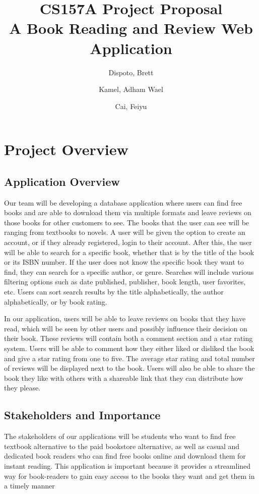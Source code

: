 \documentclass[letter, 12pt, titlepage]{article}
\author{ Dispoto, Brett\\
	\and
	Kamel, Adham Wael\\
	\and
	Cai, Feiyu\\
}
\title{CS157A Project Proposal \\
	\large A Book Reading and Review Web Application}
\begin{document}
	\maketitle
	\section{Project Overview}
	\subsection{Application Overview}
	Our team will be developing a database application where users can find free books and are able to download them via multiple formats and leave reviews on those books for other customers to see. The books that the user can see will be ranging from textbooks to novels. A user will be given the option to create an account, or if they already registered, login to their account. After this, the user will be able to search for a specific book, whether that is by the title of the book or its ISBN number. If the user does not know the specific book they want to find, they can search for a specific author, or genre. Searches will include various filtering options such as date published, publisher, book length, user favorites, etc. Users can sort search results by the title alphabetically, the author alphabetically, or by book rating.

\medskip
	In our application, users will be able to leave reviews on books that they have read, which will be seen by other users and possibly influence their decision on their book. These reviews will contain both a comment section and a star rating system. Users will be able to comment how they either liked or disliked the book and give a star rating from one to five. The average star rating and total number of reviews will be displayed next to the book. Users will also be able to share the book they like with others with a shareable link that they can distribute how they please.
	\subsection{Stakeholders and Importance}
	The stakeholders of our applications will be students who want to find free textbook alternative to the paid bookstore alternative, as well as casual and dedicated book readers who can find free books online and download them for instant reading. This application is important because it provides a streamlined way for book-readers to gain easy access to the books they want and get them in a timely manner
\end{document}
